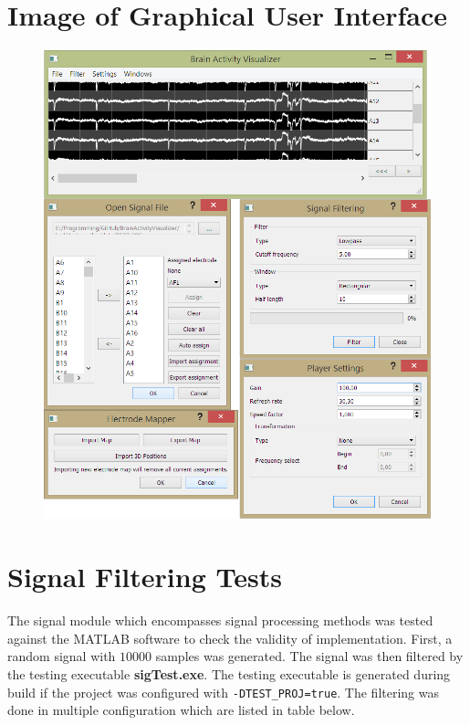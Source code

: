 \chapter{Image of Graphical User Interface}
\begin{figure}[htb]
	\centering
	\includegraphics[width=0.85\linewidth]{fig/gui.png}
\end{figure}

\chapter{Signal Filtering Tests}
The signal module which encompasses signal processing methods was tested against the MATLAB software to check the validity of implementation. First, a random signal with  $10000$ samples was generated. The signal was then filtered by the testing executable \textbf{sigTest.exe}. The testing executable is generated during build if the project was configured with \texttt{-DTEST\_PROJ=true}. The filtering was done in multiple configuration which are listed in table below.

